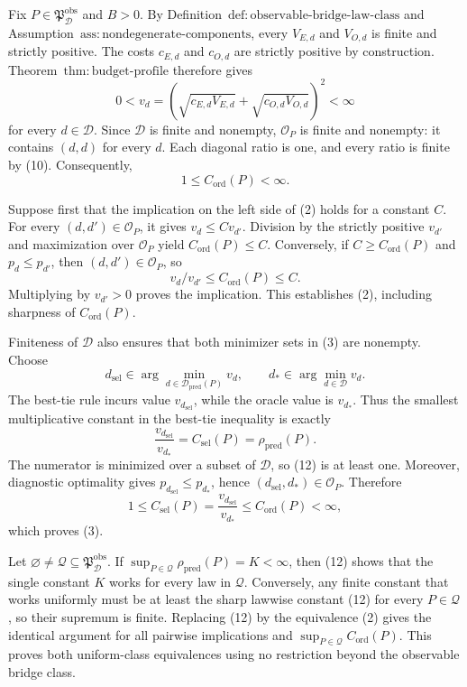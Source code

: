 Fix \(P\in\mathfrak P_{\mathcal D}^{\mathrm{obs}}\) and \(B>0\).  By Definition~\(\mathrm{def{:}observable\text{-}bridge\text{-}law\text{-}class}\) and Assumption~\(\mathrm{ass{:}nondegenerate\text{-}components}\), every \(V_{E,d}\) and \(V_{O,d}\) is finite and strictly positive.  The costs \(c_{E,d}\) and \(c_{O,d}\) are strictly positive by construction.  Theorem~\(\mathrm{thm{:}budget\text{-}profile}\) therefore gives
\[
 0<v_d
 =\left(\sqrt{c_{E,d}V_{E,d}}+
          \sqrt{c_{O,d}V_{O,d}}\right)^2
 <\infty                                                     \tag{10}
\]
for every \(d\in\mathcal D\).  Since \(\mathcal D\) is finite and nonempty, \(\mathcal O_P\) is finite and nonempty: it contains \((d,d)\) for every \(d\).  Each diagonal ratio is one, and every ratio is finite by (10).  Consequently,
\[
 1\le C_{\mathrm{ord}}(P)<\infty.                           \tag{11}
\]

Suppose first that the implication on the left side of (2) holds for a constant \(C\).  For every \((d,d')\in\mathcal O_P\), it gives \(v_d\le C v_{d'}\).  Division by the strictly positive \(v_{d'}\) and maximization over \(\mathcal O_P\) yield \(C_{\mathrm{ord}}(P)\le C\).  Conversely, if \(C\ge C_{\mathrm{ord}}(P)\) and \(p_d\le p_{d'}\), then \((d,d')\in\mathcal O_P\), so
\[
 v_d/v_{d'}\le C_{\mathrm{ord}}(P)\le C.
\]
Multiplying by \(v_{d'}>0\) proves the implication.  This establishes (2), including sharpness of \(C_{\mathrm{ord}}(P)\).

Finiteness of \(\mathcal D\) also ensures that both minimizer sets in (3) are nonempty.  Choose
\[
 d_{\mathrm{sel}}\in\arg\min_{d\in\mathcal D_{\mathrm{pred}}(P)}v_d,
 \qquad
 d_*\in\arg\min_{d\in\mathcal D}v_d.
\]
The best-tie rule incurs value \(v_{d_{\mathrm{sel}}}\), while the oracle value is \(v_{d_*}\).  Thus the smallest multiplicative constant in the best-tie inequality is exactly
\[
 \frac{v_{d_{\mathrm{sel}}}}{v_{d_*}}
 =C_{\mathrm{sel}}(P)
 =\rho_{\mathrm{pred}}(P).                                 \tag{12}
\]
The numerator is minimized over a subset of \(\mathcal D\), so (12) is at least one.  Moreover, diagnostic optimality gives \(p_{d_{\mathrm{sel}}}\le p_{d_*}\), hence \((d_{\mathrm{sel}},d_*)\in\mathcal O_P\).  Therefore
\[
 1\le C_{\mathrm{sel}}(P)
 =\frac{v_{d_{\mathrm{sel}}}}{v_{d_*}}
 \le C_{\mathrm{ord}}(P)<\infty,                           \tag{13}
\]
which proves (3).

Let \(\varnothing\ne\mathcal Q\subseteq\mathfrak P_{\mathcal D}^{\mathrm{obs}}\).  If \(\sup_{P\in\mathcal Q}\rho_{\mathrm{pred}}(P)=K<\infty\), then (12) shows that the single constant \(K\) works for every law in \(\mathcal Q\).  Conversely, any finite constant that works uniformly must be at least the sharp lawwise constant (12) for every \(P\in\mathcal Q\), so their supremum is finite.  Replacing (12) by the equivalence (2) gives the identical argument for all pairwise implications and \(\sup_{P\in\mathcal Q}C_{\mathrm{ord}}(P)\).  This proves both uniform-class equivalences using no restriction beyond the observable bridge class.

